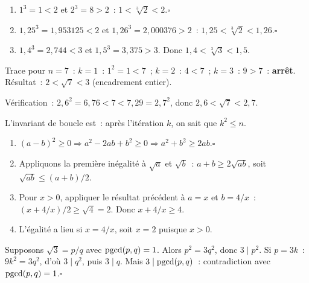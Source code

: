 
\begin{enumerate}
  \item $1^3=1<2$ et $2^3=8>2$~: $1<\sqrt[3]{2}<2$.\hfill$\square$
  \item $1{,}25^3=1{,}953125<2$ et $1{,}26^3=2{,}000376>2$~:
        $1{,}25<\sqrt[3]{2}<1{,}26$.\hfill$\square$
  \item $1{,}4^3=2{,}744<3$ et $1{,}5^3=3{,}375>3$.
        Donc $1{,}4<\sqrt[3]{3}<1{,}5$.
\end{enumerate}


Trace pour $n=7$~:
$k=1$~: $1^2=1<7$~; $k=2$~: $4<7$~; $k=3$~: $9>7$~: \textbf{arr\^et}.
R\'esultat~: $2<\sqrt{7}<3$ (encadrement entier).

V\'erification~: $2{,}6^2=6{,}76<7<7{,}29=2{,}7^2$, donc $2{,}6<\sqrt{7}<2{,}7$.

L'invariant de boucle est~: \og apr\`es l'it\'eration $k$, on sait que $k^2\leq n$\fg.


\begin{enumerate}
  \item $(a-b)^2\geq0 \Rightarrow a^2-2ab+b^2\geq0 \Rightarrow a^2+b^2\geq2ab$.\hfill$\square$
  \item Appliquons la premi\`ere in\'egalit\'e \`a $\sqrt a$ et $\sqrt b$~:
        $a+b\geq2\sqrt{ab}$, soit $\sqrt{ab}\leq(a+b)/2$.
  \item Pour $x>0$, appliquer le r\'esultat pr\'ec\'edent \`a
        $a=x$ et $b=4/x$~: $(x+4/x)/2\geq\sqrt4=2$.
        Donc $x+4/x\geq4$.
  \item L'\'egalit\'e a lieu si $x=4/x$, soit $x=2$ puisque $x>0$.
\end{enumerate}


Supposons $\sqrt{3}=p/q$ avec $\operatorname{pgcd}(p,q)=1$.
Alors $p^2=3q^2$, donc $3\mid p^2$.
Si $p=3k$~: $9k^2=3q^2$, d'o\`u $3\mid q^2$, puis $3\mid q$.
Mais $3\mid\operatorname{pgcd}(p,q)$~: contradiction avec $\operatorname{pgcd}(p,q)=1$.\hfill$\square$

